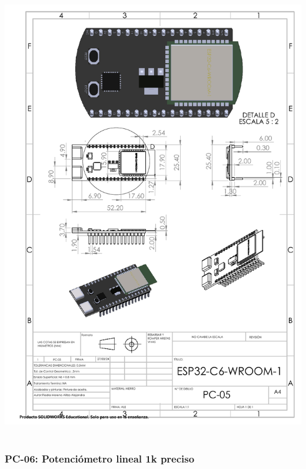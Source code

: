 \begin{center}
\includegraphics[width=.85\textwidth]{22/img/esp32Dibujo.pdf}~\\[15cm]
\end{center}

\subsubsection{PC-06: Potenciómetro lineal 1k preciso }

